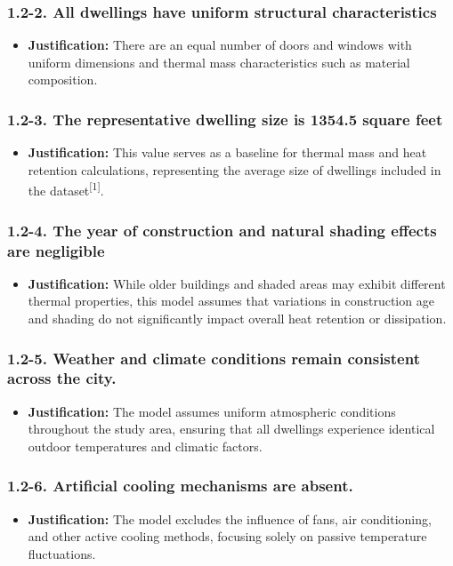 \documentclass{article}
\begin{document}
\subsubsection*{1.2-2. All dwellings have uniform structural characteristics}
\begin{itemize}
    \item \textbf{Justification:} There are an equal number of doors and windows with uniform dimensions and thermal mass characteristics such as material composition.
\end{itemize}

\subsubsection*{1.2-3. The representative dwelling size is 1354.5 square feet}
\begin{itemize}
    \item \textbf{Justification:} This value serves as a baseline for thermal mass and heat retention calculations, representing the average size of dwellings included in the dataset\textsuperscript{[1]}. 
\end{itemize}

\subsubsection*{1.2-4. The year of construction and natural shading effects are negligible}
\begin{itemize}
    \item \textbf{Justification:} While older buildings and shaded areas may exhibit different thermal properties, this model assumes that variations in construction age and shading do not significantly impact overall heat retention or dissipation. 
\end{itemize}

\subsubsection*{1.2-5. Weather and climate conditions remain consistent across the city.}
\begin{itemize}
    \item \textbf{Justification:} The model assumes uniform atmospheric conditions throughout the study area, ensuring that all dwellings experience identical outdoor temperatures and climatic factors.
\end{itemize}

\subsubsection*{1.2-6. Artificial cooling mechanisms are absent.}
\begin{itemize}
    \item \textbf{Justification:} The model excludes the influence of fans, air conditioning, and other active cooling methods, focusing solely on passive temperature fluctuations. 
\end{itemize}
\end{document}
